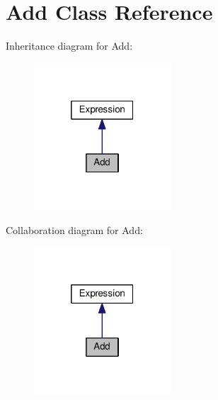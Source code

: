 \hypertarget{classAdd}{}\section{Add Class Reference}
\label{classAdd}


Inheritance diagram for Add\+:\nopagebreak
\begin{figure}[H]
\begin{center}
\leavevmode
\includegraphics[width=145pt]{classAdd__inherit__graph}
\end{center}
\end{figure}


Collaboration diagram for Add\+:\nopagebreak
\begin{figure}[H]
\begin{center}
\leavevmode
\includegraphics[width=145pt]{classAdd__coll__graph}
\end{center}
\end{figure}
